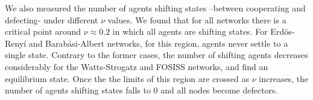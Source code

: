 \documentclass[11pt]{article}
\begin{document}
\FloatBarrier

We also measured the number of agents shifting states --between cooperating and
defecting- under different $\nu$ values. We found that for all networks there is
a critical point around  $\nu \approx 0.2$ in which all agents are shifting
states. For Erd\"{o}s-Reny\'i and Barab\'asi-Albert networks, for this region,
agents never settle to a single state. Contrary to the former cases, the number
of shifting agents decreases considerably for the Watts-Strogatz and FOSISS
networks, and find an equilibrium state. Once the the limits of this region are
crossed as $\nu$ increases, the number of agents shifting states falls to $0$
and all nodes become defectors. 


\begin{figure} [h!]
\centering
\begin{tabular}{cc}


\end{tabular}
\end{figure}
\end{document}
